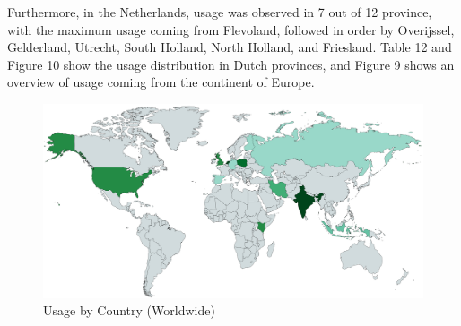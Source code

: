 \documentclass{article}
\begin{document}
Furthermore, in the Netherlands, usage was observed in 7 out of 12 province, with the maximum usage coming from Flevoland, followed in order by Overijssel, Gelderland, Utrecht, South Holland, North Holland, and Friesland. Table 12 and Figure 10 show the usage distribution in Dutch provinces, and Figure 9 shows an overview of usage coming from the continent of Europe.

\begin{figure}[h]
	\includegraphics[width=\textwidth]{location-world.png}
	\caption{Usage by Country (Worldwide)}
\end{figure}
\end{document}
